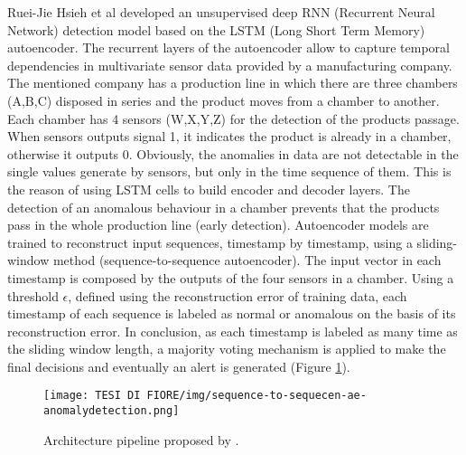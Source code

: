 Ruei-Jie Hsieh et al \cite{9UnsupervisedOnlineAnomalyDetectionMultivariate} developed an unsupervised deep RNN (Recurrent Neural Network) detection model based on the LSTM (Long Short Term Memory) autoencoder. The recurrent layers of the autoencoder allow to capture temporal dependencies in multivariate sensor data provided by a manufacturing company. The mentioned company has a production line in which there are three chambers (A,B,C) disposed in series and the product moves from a chamber to another. Each chamber has 4 sensors (W,X,Y,Z) for the detection of the products passage. When sensors outputs signal 1, it indicates the product is already in a chamber, otherwise it outputs 0. Obviously, the anomalies in data are not detectable in the single values generate by sensors, but only in the time sequence of them. This is the reason of using LSTM cells to build encoder and decoder layers. The detection of an anomalous behaviour in a chamber prevents that the products pass in the whole production line (early detection). Autoencoder models are trained to reconstruct input sequences, timestamp by timestamp, using a sliding-window method (sequence-to-sequence autoencoder). The input vector in each timestamp is composed by the outputs of the four sensors in a chamber. Using a threshold $\epsilon$, defined using the reconstruction error of training data, each timestamp of each sequence is labeled as normal or anomalous on the basis of its reconstruction error. In conclusion, as each timestamp is labeled as many time as the sliding window length, a majority voting mechanism is applied to make the final decisions and eventually an alert is generated (Figure \ref{seq2seq-architecture}).
\begin{figure}[ht]
\texttt{[image: TESI DI FIORE/img/sequence-to-sequecen-ae-anomalydetection.png]}
\centering
\caption{Architecture pipeline proposed by \cite{9UnsupervisedOnlineAnomalyDetectionMultivariate}.}
\label{seq2seq-architecture}
\end{figure}\\
